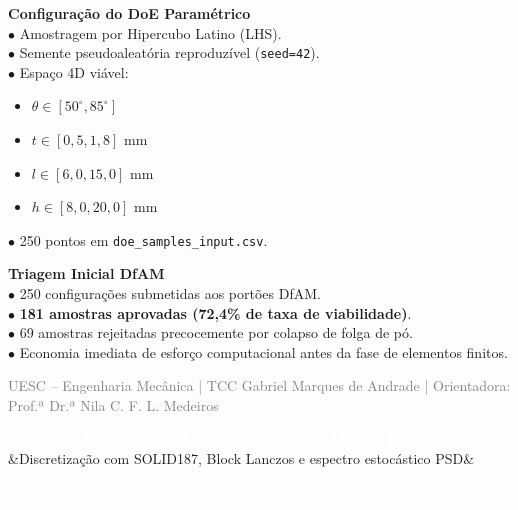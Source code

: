 \documentclass[11pt]{article}
\newcommand{\slideheader}[3]{
    \noindent
    \begin{minipage}{\textwidth}
        \colorbox{SpaceNavy}{
            \parbox{\dimexpr\textwidth-2\fboxsep\relax}{
                \vspace{0.2cm}
                \hspace{0.3cm}
                \begin{minipage}{0.85\textwidth}
                    {\Large \textbf{\textcolor{white}{#1}}}\\[0.1cm]
                    \ifx&#2&\else{\small \textbf{\textcolor{SpaceGold}{#2}}}\fi
                \end{minipage}
                \hfill
                \begin{minipage}{0.10\textwidth}
                    \raggedleft
                    {\large \textbf{\textcolor{white}{#3 / 20}}}\hspace{0.3cm}
                \end{minipage}
                \vspace{0.2cm}
            }
        }
    \end{minipage}
    \vspace{0.4cm}
}
\newcommand{\slidefooter}{
    \vfill
    \noindent
    \begin{minipage}{\textwidth}
        \centering
        \scriptsize \textcolor{gray}{UESC -- Engenharia Mecânica | TCC Gabriel Marques de Andrade | Orientadora: Prof.ª Dr.ª Nila C. F. L. Medeiros}
    \end{minipage}
}
\begin{document}
\begin{minipage}[t]{0.48\textwidth}
    \textbf{\textcolor{NavyAccent}{Configuração do DoE Paramétrico}}\\[0.2cm]
    \small
    $\bullet$ Amostragem por Hipercubo Latino (LHS).\\
    $\bullet$ Semente pseudoaleatória reproduzível (\texttt{seed=42}).\\
    $\bullet$ Espaço 4D viável:
    \begin{itemize}
        \item $\theta \in [50^\circ, 85^\circ]$
        \item $t \in [0{,}5, 1{,}8]\text{ mm}$
        \item $l \in [6{,}0, 15{,}0]\text{ mm}$
        \item $h \in [8{,}0, 20{,}0]\text{ mm}$
    \end{itemize}
    $\bullet$ 250 pontos em \texttt{doe\_samples\_input.csv}.
\end{minipage}
\hfill
\begin{minipage}[t]{0.48\textwidth}
    \textbf{\textcolor{NavyAccent}{Triagem Inicial DfAM}}\\[0.2cm]
    \small
    $\bullet$ 250 configurações submetidas aos portões DfAM.\\
    $\bullet$ \textbf{181 amostras aprovadas (72,4\% de taxa de viabilidade)}.\\
    $\bullet$ 69 amostras rejeitadas precocemente por colapso de folga de pó.\\
    $\bullet$ Economia imediata de esforço computacional antes da fase de elementos finitos.
\end{minipage}

\slidefooter
\clearpage

\slideheader{Simulação Numérica de Alta Ordem: Ansys MAPDL Batch}{Discretização com SOLID187, Block Lanczos e espectro estocástico PSD}{09}
\end{document}
